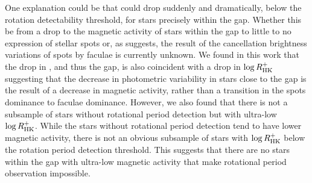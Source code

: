 One explanation could be that \rper{} could drop suddenly and dramatically, below the rotation detectability threshold, for stars precisely within the gap.
Whether this be from a drop to the magnetic activity of stars within the gap to little to no expression of stellar spots or, as \citet{reinhold_transition_2018} suggests, the result of the cancellation brightness variations of spots by faculae is currently unknown.
We found in this work that the drop in \rper{}, and thus the gap, is also coincident with a drop in $\log R^{+}_{\rm{HK}}$ suggesting that the decrease in photometric variability in stars close to the gap is the result of a decrease in magnetic activity, rather than a transition in the spots dominance to faculae dominance.
However, we also found that there is not a subsample of stars without rotational period detection but with ultra-low $\log R^{+}_{\rm{HK}}$.
While the stars without rotational period detection tend to have lower magnetic activity, there is not an obvious subsample of stars with $\log R^{+}_{\rm{HK}}$ below the rotation period detection threshold.
This suggests that there are no stars within the gap with ultra-low magnetic activity that make rotational period observation impossible.


